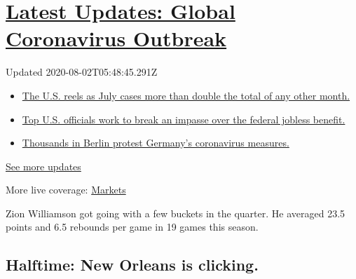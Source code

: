 \hypertarget{latest-updates-global-coronavirus-outbreak}{%
\section{\texorpdfstring{\href{https://www.nytimes.com/2020/08/01/world/coronavirus-covid-19.html?action=click\&pgtype=Article\&state=default\&region=MAIN_CONTENT_1\&context=storylines_live_updates}{Latest
Updates: Global Coronavirus
Outbreak}}{Latest Updates: Global Coronavirus Outbreak}}\label{latest-updates-global-coronavirus-outbreak}}

Updated 2020-08-02T05:48:45.291Z

\begin{itemize}
\tightlist
\item
  \href{https://www.nytimes.com/2020/08/01/world/coronavirus-covid-19.html?action=click\&pgtype=Article\&state=default\&region=MAIN_CONTENT_1\&context=storylines_live_updates\#link-34047410}{The
  U.S. reels as July cases more than double the total of any other
  month.}
\item
  \href{https://www.nytimes.com/2020/08/01/world/coronavirus-covid-19.html?action=click\&pgtype=Article\&state=default\&region=MAIN_CONTENT_1\&context=storylines_live_updates\#link-780ec966}{Top
  U.S. officials work to break an impasse over the federal jobless
  benefit.}
\item
  \href{https://www.nytimes.com/2020/08/01/world/coronavirus-covid-19.html?action=click\&pgtype=Article\&state=default\&region=MAIN_CONTENT_1\&context=storylines_live_updates\#link-25930521}{Thousands
  in Berlin protest Germany's coronavirus measures.}
\end{itemize}

\href{https://www.nytimes.com/2020/08/01/world/coronavirus-covid-19.html?action=click\&pgtype=Article\&state=default\&region=MAIN_CONTENT_1\&context=storylines_live_updates}{See
more updates}

More live coverage:
\href{https://www.nytimes.com/live/2020/07/31/business/stock-market-today-coronavirus?action=click\&pgtype=Article\&state=default\&region=MAIN_CONTENT_1\&context=storylines_live_updates}{Markets}

Zion Williamson got going with a few buckets in the quarter. He averaged
23.5 points and 6.5 rebounds per game in 19 games this season.

\hypertarget{halftime-new-orleans-is-clicking}{%
\subsection{Halftime: New Orleans is
clicking.}\label{halftime-new-orleans-is-clicking}}

